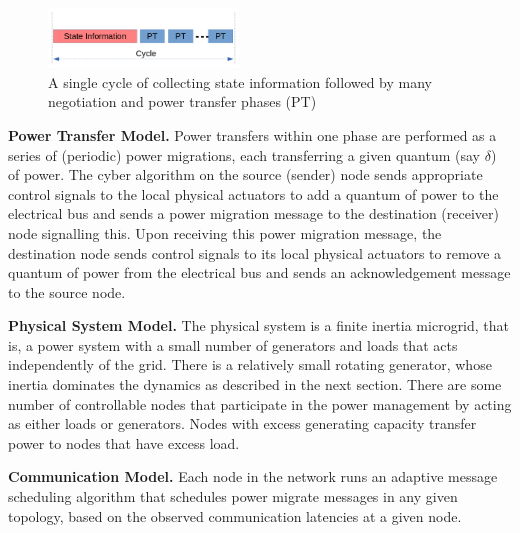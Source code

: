 \begin{figure}[htb]
  \begin{center}
    \includegraphics[width=0.45\textwidth]{Figures/cycle_fig.png}
  \caption{A single cycle of collecting state information followed by many negotiation and power transfer phases (PT)}
  \label{fig:cycle}
  \end{center}
\end{figure}

{\bf Power Transfer Model.} Power transfers within one phase are performed as a
series of (periodic) power migrations, each transferring a given quantum (say
$\delta$) of power. The cyber algorithm on the source (sender) node sends
appropriate control signals to the local physical actuators to add a quantum of
power to the electrical bus and sends a power migration message to the
destination (receiver) node signalling this. Upon receiving this power migration
message, the destination node sends control signals to its local physical
actuators to remove a quantum of power from the electrical bus and sends an
acknowledgement message to the source node.

{\bf Physical System Model.} The physical system is a finite inertia microgrid,
that is, a power system with a small number of generators and loads that acts
independently of the grid. There is a relatively small rotating generator,
whose inertia dominates the dynamics as described in the next section. There
are some number of controllable nodes that participate in the power management
by acting as either loads or generators. Nodes with excess generating capacity
transfer power to nodes that have excess load.

{\bf Communication Model.} 
Each node in the network runs an adaptive message scheduling algorithm that schedules power migrate messages in any given 
topology, based on the observed communication latencies at a given node. 
